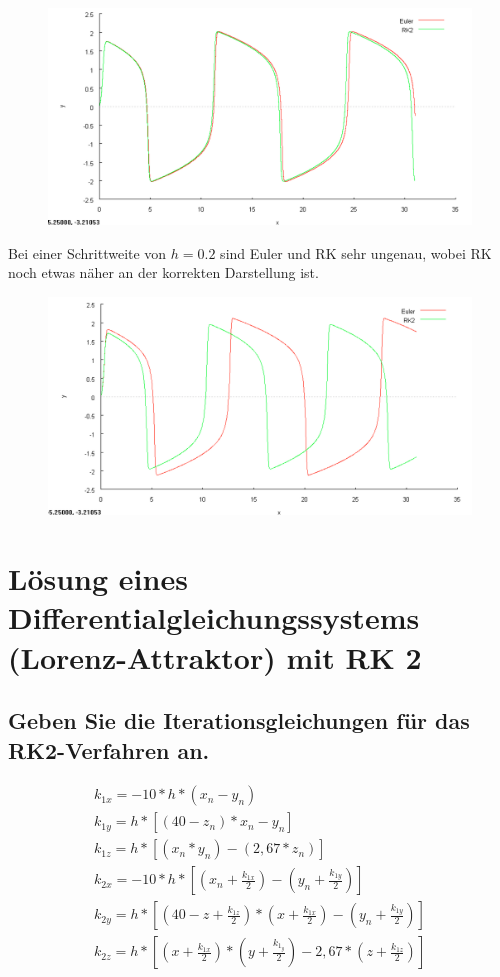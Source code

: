 \documentclass[10pt,a4paper]{article}
\begin{document}
\begin{figure}[h]
\centering
\includegraphics[width=0.9\linewidth]{../screenshots/van001.png}
\end{figure}
Bei einer Schrittweite von $h = 0.2$ sind Euler und RK sehr ungenau, wobei RK noch etwas näher an der korrekten Darstellung ist.
\begin{figure}[h]
\centering
\includegraphics[width=0.9\linewidth]{../screenshots/van02.png}
\end{figure}

\section{Lösung eines Differentialgleichungssystems (Lorenz-Attraktor) mit RK 2}
\subsection{Geben Sie die Iterationsgleichungen für das RK2-Verfahren an.}
\begin{subequations}
\begin{align}
k_{1x} = -10 * h * (x_n - y_n)\\
k_{1y} = h * [(40-z_n) * x_n - y_n]\\
k_{1z} = h * [(x_n * y_n) - (2,67 * z_n)]\\
k_{2x} = -10 * h * [(x_n +\frac{k_{1x}}{2}) - (y_n + \frac{k_{1y}}{2})]\\
k_{2y} = h * [(40 - z + \frac{k_{1z}}{2}) * (x + \frac{k_{1x}}{2}) - (y_n + \frac{k_{1y}}{2})]\\
k_{2z} = h * [(x + \frac{k_{1x}}{2}) * (y + \frac{k_{1_y}}{2}) - 2,67 * (z + \frac{k_{1z}}{2})]
\end{align}
\end{subequations}
\end{document}
